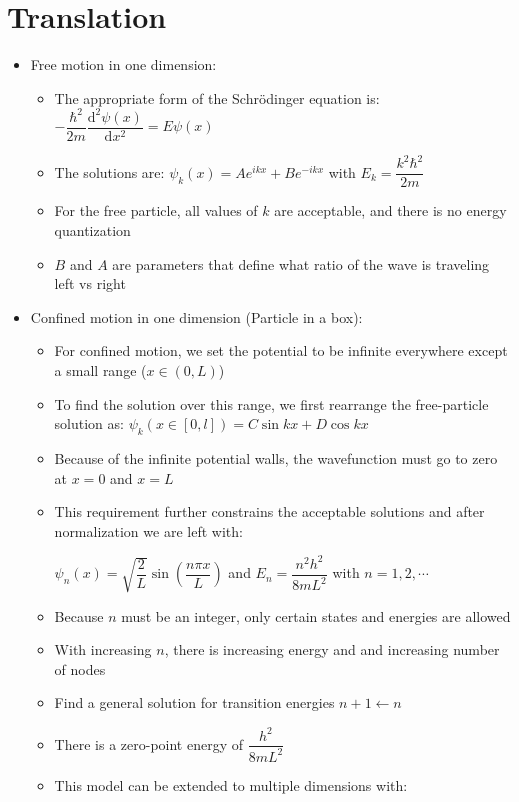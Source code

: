 \documentclass[12pt, openany, letterpaper]{memoir}
\begin{document}
\section{Translation}
\begin{itemize}
	\item Free motion in one dimension:
	\begin{itemize}
		\item The appropriate form of the Schr\"odinger equation is: $-\dfrac{\hbar^2}{2m}\dfrac{\mathrm{d}^2\psi(x)}{\mathrm{d}x^2}=E\psi(x)$
		\item The solutions are: $\psi_k(x)=Ae^{ikx}+Be^{-ikx}$ with $E_k = \dfrac{k^2\hbar^2}{2m}$
		\item For the free particle, all values of $k$ are acceptable, and there is no energy quantization
		\item $B$ and $A$ are parameters that define what ratio of the wave is traveling left vs right
	\end{itemize}
	\item Confined motion in one dimension (Particle in a box):
	\begin{itemize}
		\item For confined motion, we set the potential to be infinite everywhere except a small range ($x\in (0,L)$)
		\item To find the solution over this range, we first rearrange the free-particle solution as: $\psi_k\left(x\in [0,l]\right) = C\sin kx + D\cos kx$
		\item Because of the infinite potential walls, the wavefunction must go to zero at $x=0$ and $x=L$
		\item This requirement further constrains the acceptable solutions and after normalization we are left with:
		
		 $\psi_n(x) = \sqrt{\dfrac{2}{L}}\sin\left(\dfrac{n\pi x}{L}\right)$ and $E_n = \dfrac{n^2h^2}{8mL^2}$ with $n=1,2,\cdots$
		 \item Because $n$ must be an integer, only certain states and energies are allowed
		 \item With increasing $n$, there is increasing energy and and increasing number of nodes
		 \item Find a general solution for transition energies $n+1\leftarrow n$
		 \item There is a zero-point energy of $\dfrac{h^2}{8mL^2}$
		 \item This model can be extended to multiple dimensions with:
		 

\end{itemize}
\end{itemize}
\end{document}
